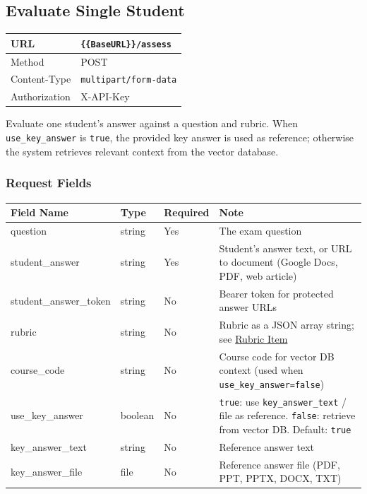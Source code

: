 \documentclass[11pt]{article}
\begin{document}
\subsection{Evaluate Single Student}

\begin{tabular}{|H{3cm}|p{12.1cm}|}
  \hline
  URL           & \texttt{\{\{BaseURL\}\}/assess} \\
  \hline
  Method        & POST \\
  \hline
  Content-Type  & \texttt{multipart/form-data} \\
  \hline
  Authorization & X-API-Key \\
  \hline
\end{tabular}

Evaluate one student's answer against a question and rubric. When
\texttt{use\_key\_answer} is \texttt{true}, the provided key answer is used as
reference; otherwise the system retrieves relevant context from the vector
database.

\subsubsection{Request Fields}

\begin{longtable}{|p{3.8cm}|p{2cm}|p{1.8cm}|p{6.7cm}|}
  \hline
  \rowcolor{tabheader}
  \textbf{Field Name} & \textbf{Type} & \textbf{Required} & \textbf{Note} \\
  \hline
  \endhead
  question               & string  & Yes & The exam question \\
  \hline
  student\_answer        & string  & Yes & Student's answer text, or URL to document (Google Docs, PDF, web article) \\
  \hline
  student\_answer\_token & string  & No  & Bearer token for protected answer URLs \\
  \hline
  rubric                 & string  & No  & Rubric as a JSON array string; see \hyperref[sec:rubricitem]{Rubric Item} \\
  \hline
  course\_code           & string  & No  & Course code for vector DB context (used when \texttt{use\_key\_answer=false}) \\
  \hline
  use\_key\_answer       & boolean & No  & \texttt{true}: use \texttt{key\_answer\_text} / file as reference. \texttt{false}: retrieve from vector DB. Default: \texttt{true} \\
  \hline
  key\_answer\_text      & string  & No  & Reference answer text \\
  \hline
  key\_answer\_file      & file    & No  & Reference answer file (PDF, PPT, PPTX, DOCX, TXT) \\
  \hline
\end{longtable}
\end{document}
